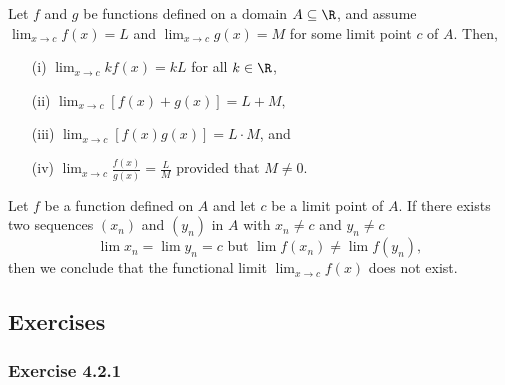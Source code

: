 \begin{tcolorbox}
    \begin{cor}
    Let \( f \) and \( g \) be functions defined on a domain \( A \subseteq \R  \), and assume \( \lim_{ x \to c } f(x) = L  \) and \( \lim_{ x \to c } g(x) = M  \) for some limit point \( c \) of \( A  \). Then, 
    \begin{enumerate}
        \item[(i)] \( \lim_{ x \to c } kf(x) = kL  \) for all \( k \in \R  \),
        \item[(ii)] \( \lim_{ x \to c } [f(x) + g(x)] = L + M, \)
        \item[(iii)] \( \lim_{ x \to c } [f(x)g(x)] = L \cdot M  \), and 
        \item[(iv)] \( \lim_{ x \to c } \frac{ f(x) }{ g(x)  } = \frac{ L }{ M }  \) provided that \( M \neq  0 \).
    \end{enumerate}
    \end{cor}
\end{tcolorbox}


\begin{tcolorbox}
    \begin{cor}
    Let \( f \) be a function defined on \( A  \) and let \( c  \) be a limit point of \( A  \). If there exists two sequences \( (x_n) \) and \( (y_n) \) in \( A  \) with \( x_n \neq  c \) and \( y_n \neq c  \) 
    \[  \lim x_n = \lim y_n = c \text{~but~} \lim f(x_n) \neq \lim f(y_n),  \]
    then we conclude that the functional limit \( \lim_{x \to c } f(x)  \) does not exist.
    \end{cor}
\end{tcolorbox}
\subsection{Exercises}
\subsubsection{Exercise 4.2.1}

